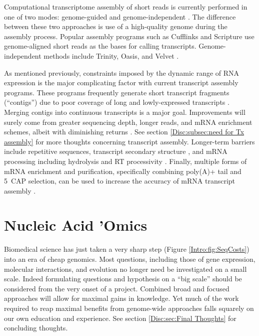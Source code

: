     Computational transcriptome assembly of short reads is currently performed in one of two modes: genome-guided and genome-independent \citep{Garber2011a}. The difference between these two approaches is use of a high-quality genome during the assembly process. Popular assembly programs such as Cufflinks \citep{Trapnell2010} and Scripture \citep{Guttman2010} use genome-aligned short reads as the bases for calling transcripts. Genome-independent methods include Trinity, Oasis, and Velvet \citep{Haas2013c,Schulz2012,Zerbino2008}.

    As mentioned previously, constraints imposed by the dynamic range of RNA expression is the major complicating factor with current transcript assembly programs. These programs frequently generate short transcript fragments (``contigs'') due to poor coverage of long and lowly-expressed transcripts \citep{Rehrauer2013,Steijger2013}. Merging contigs into  continuous transcripts is a major goal. Improvements will surely come from greater sequencing depth, longer reads, and mRNA enrichment schemes, albeit with diminishing returns \citep{Chang2014c}. See section \ref{Disc:subsec:need for Tx assembly} for more thoughts concerning transcript assembly. Longer-term barriers include repetitive sequences, transcript secondary structure \citep{Wan2014}, and mRNA processing including hydrolysis and RT processivity \citep{Sharon2013}. Finally, multiple forms of mRNA enrichment and purification, specifically combining poly(A)+ tail and 5\textprime~CAP selection, can be used to increase the accuracy of mRNA transcript assembly \citep{Blower2013}.

\section{Nucleic Acid 'Omics}
  \label{Intro:sec:Unique Time in Omics}

  Biomedical science has just taken a very sharp step (Figure \ref{Intro:fig:SeqCosts}) into an era of cheap genomics. Most questions, including those of gene expression, molecular interactions, and evolution no longer need be investigated on a small scale. Indeed formulating questions and hypothesis on a ``big scale'' should be considered from the very onset of a project. Combined broad and focused approaches will allow for maximal gains in knowledge. Yet much of the work required to reap maximal benefits from genome-wide approaches falls squarely on our own education and experience. See section \ref{Disc:sec:Final Thoughts} for concluding thoughts.

\cleardoublepage %
